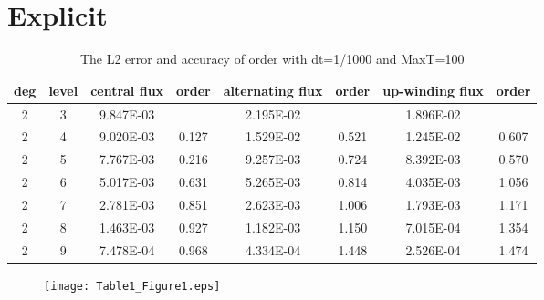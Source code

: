 \documentclass[a4paper]{article}
\begin{document}
\section{Explicit}

\begin{table}[htbp]
\caption{\label{tab:test}The L2 error and accuracy of order with dt=1/1000 and MaxT=100}
\centering
\vspace{5pt}
\begin{tabular}{cccccccc}
\toprule
deg &level &central flux &order &alternating flux &order &up-winding flux &order\\
\midrule
2 &3 &9.847E-03 &         &2.195E-02 &         &1.896E-02 &         \\
2 &4 &9.020E-03 &0.127&1.529E-02 &0.521&1.245E-02 &0.607\\
2 &5 &7.767E-03 &0.216&9.257E-03 &0.724&8.392E-03 &0.570\\
2 &6 &5.017E-03 &0.631&5.265E-03 &0.814&4.035E-03 &1.056\\
2 &7 &2.781E-03 &0.851&2.623E-03 &1.006&1.793E-03 &1.171\\
2 &8 &1.463E-03 &0.927&1.182E-03 &1.150&7.015E-04 &1.354\\
2 &9 &7.478E-04 &0.968&4.334E-04 &1.448&2.526E-04 &1.474\\
\bottomrule
\end{tabular}
\end{table}
\begin{figure}
\centering
\texttt{[image: Table1\_Figure1.eps]}
\end{figure}
\end{document}
